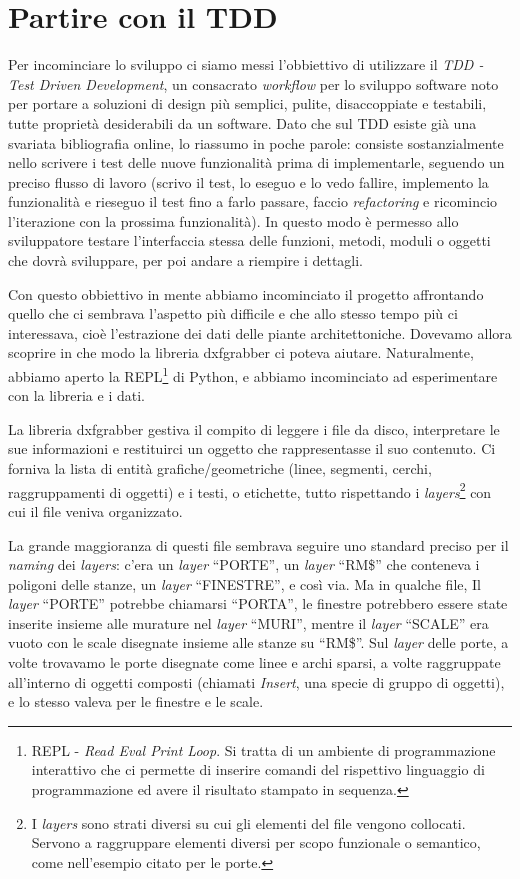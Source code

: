 \documentclass[12pt]{report}
\begin{document}
\section{Partire con il TDD}

Per incominciare lo sviluppo ci siamo messi l'obbiettivo di utilizzare il
\textit{TDD - Test Driven Development}, un consacrato \textit{workflow} per lo
sviluppo software noto per portare a soluzioni di design più semplici, pulite,
disaccoppiate e testabili, tutte proprietà desiderabili da un software. Dato
che sul TDD esiste già una svariata bibliografia online, lo riassumo in poche
parole: consiste sostanzialmente nello scrivere i test delle nuove
funzionalità prima di implementarle, seguendo un preciso flusso di lavoro
(scrivo il test, lo eseguo e lo vedo fallire, implemento la funzionalità e
rieseguo il test fino a farlo passare, faccio \textit{refactoring} e
ricomincio l'iterazione con la prossima funzionalità). 
In questo modo è permesso allo
sviluppatore testare l'interfaccia stessa delle funzioni, metodi, moduli o
oggetti che dovrà sviluppare, per poi andare a riempire i dettagli.

Con questo obbiettivo in mente abbiamo incominciato il progetto
affrontando quello che ci sembrava l'aspetto più difficile e che allo
stesso tempo più ci interessava, cioè l'estrazione dei dati delle
piante architettoniche. Dovevamo allora scoprire in che modo la
libreria dxfgrabber ci poteva aiutare. Naturalmente, abbiamo
aperto la REPL\footnote{
	REPL - \textit{Read Eval Print Loop}. Si tratta di un ambiente di
	programmazione interattivo che ci permette di inserire comandi del
	rispettivo linguaggio di programmazione ed avere il risultato
	stampato in sequenza. 
} 
di Python, e abbiamo incominciato ad esperimentare con la libreria e i dati.

La libreria dxfgrabber gestiva il compito di leggere i file da disco,
interpretare le sue informazioni e restituirci un oggetto che
rappresentasse il suo contenuto. Ci forniva la lista di entità
grafiche/geometriche (linee, segmenti, cerchi, raggruppamenti di
oggetti) e i testi, o etichette, tutto rispettando i 
\textit{layers}\footnote{
	I \textit{layers} sono strati diversi su cui gli elementi del file
	vengono collocati. Servono a raggruppare elementi diversi per scopo
	funzionale o semantico, come nell'esempio citato per le porte.
}
con cui il file veniva organizzato. 

La grande maggioranza di questi
file sembrava seguire uno standard preciso per il \textit{naming} dei
\textit{layers}: c'era un \textit{layer} ``PORTE'', un \textit{layer} 
``RM\$'' che conteneva i poligoni delle stanze, un \textit{layer}
``FINESTRE'', e così via. Ma in qualche file, Il \textit{layer} ``PORTE''
potrebbe chiamarsi ``PORTA'', le finestre potrebbero essere state
inserite insieme alle murature nel \textit{layer} ``MURI'', mentre
il \textit{layer} ``SCALE'' era vuoto con le scale disegnate
insieme alle stanze su ``RM\$''. Sul \textit{layer} delle porte,
a volte trovavamo le porte disegnate come linee e archi sparsi,
a volte raggruppate all'interno di oggetti composti (chiamati
\textit{Insert}, una specie di gruppo di oggetti), e lo stesso 
valeva per le finestre e le scale. 
\end{document}
